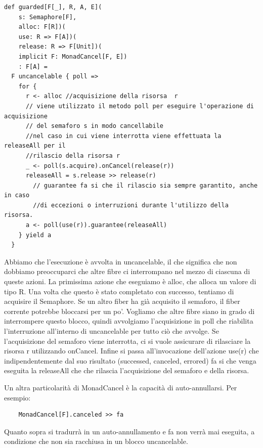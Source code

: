 \begin{verbatim}
def guarded[F[_], R, A, E](
    s: Semaphore[F],
    alloc: F[R])(
    use: R => F[A])(
    release: R => F[Unit])(
    implicit F: MonadCancel[F, E])
    : F[A] =
  F uncancelable { poll =>
    for {
      r <- alloc //acquisizione della risorsa  r
      // viene utilizzato il metodo poll per eseguire l'operazione di acquisizione
      // del semaforo s in modo cancellabile
      //nel caso in cui viene interrotta viene effettuata la releaseAll per il
      //rilascio della risorsa r
      _ <- poll(s.acquire).onCancel(release(r)) 
      releaseAll = s.release >> release(r)
        // guarantee fa si che il rilascio sia sempre garantito, anche in caso 
        //di eccezioni o interruzioni durante l'utilizzo della risorsa.
      a <- poll(use(r)).guarantee(releaseAll)
    } yield a
  }
\end{verbatim}

\noindent Abbiamo che l'esecuzione è avvolta in uncancelable, il che significa che non dobbiamo preoccuparci che altre fibre ci interrompano nel mezzo di ciascuna di queste azioni. La primissima azione che eseguiamo è alloc, che alloca un valore di tipo R. Una volta che questo è stato completato con successo, tentiamo di acquisire il  Semaphore. Se un altro fiber ha già acquisito il
semaforo, il fiber corrente potrebbe bloccarsi per un po'. Vogliamo che altre fibre siano in grado di interrompere questo blocco, quindi avvolgiamo l'acquisizione in poll che riabilita l’interruzione all’interno di uncancelable per tutto ciò che avvolge. Se l’acquisizione del semaforo viene interrotta, ci si vuole assicurare di rilasciare la risorsa r utilizzando onCancel.  Infine si passa all’invocazione dell’azione use(r) che indipendentemente dal suo risultato (successed, canceled, errored) fa si che venga eseguita la releaseAll che che rilascia l’acquisizione del semaforo e della risorsa.

Un altra particolarità di MonadCancel è la capacità di auto-annullarsi. Per esempio:
\begin{verbatim}
    MonadCancel[F].canceled >> fa
\end{verbatim}

\noindent Quanto sopra si tradurrà in un auto-annullamento e fa non verrà mai eseguita, a condizione che non sia racchiusa in un blocco uncancelable.

